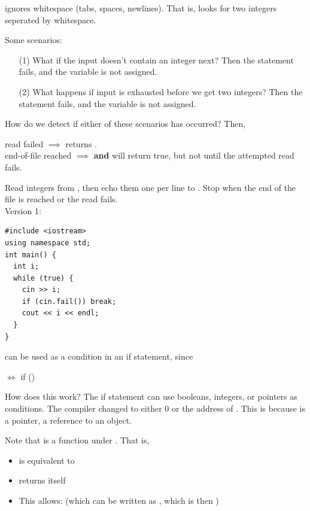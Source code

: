 \documentclass[english, 11pt]{article}
\begin{document}
\begin{note}
   ignores whitespace (tabs, spaces, newlines). That is,  looks for two integers seperated by whitespace.
\end{note}

Some scenarios:
\begin{itemize}
  \item[(1)] What if the input doesn't contain an integer next? Then the statement fails, and the variable is not assigned.
  \item[(2)] What happens if input is exhausted before we get two integers? Then the statement fails, and the variable is not assigned.
\end{itemize}

How do we detect if either of these scenarios has occurred? Then,
\begin{center}
  read failed $\implies$  returns . \\
  end-of-file reached $\implies$  \textbf{and}  will return true, but not until the attempted read fails.
\end{center}

\begin{exmp}
  Read integers from , then echo them one per line to . Stop when the end of the file is reached or the read fails. \\
  Version 1:
  \begin{lstlisting}
#include <iostream>
using namespace std;
int main() {
  int i;
  while (true) {
    cin >> i;
    if (cin.fail()) break;
    cout << i << endl;
  }
}
\end{lstlisting}
\end{exmp}

\begin{note}
   can be used as a condition in an if statement, since
  \begin{center}
     $\iff$ if ()
  \end{center}
\end{note}
  How does this work? The if statement can use booleans, integers, or pointers as conditions. The compiler changed  to either 0 or the address of . This is because  is a pointer, a reference to an object.

  Note that \tc{>>} is a function under . That is,
  \begin{itemize}
    \item {} is equivalent to 
    \item \tc{>>} returns  itself
    \item This allows:  (which can be written as , which is then )
  \end{itemize}
\end{document}
